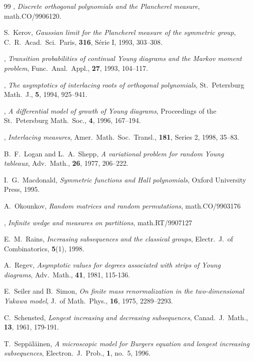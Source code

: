 \documentclass[12pt]{amsart}
\theoremstyle{plain}
\theoremstyle{definition}
\numberwithin{equation}{section}
\begin{document}
\begin{thebibliography}{99}
\bysame,
\emph{Discrete
orthogonal polynomials and the Plancherel measure},
math.CO/9906120.


S.~Kerov,
\emph{Gaussian limit for the Plancherel measure of the
symmetric group},
C.~R.\ Acad.\ Sci.\ Paris, \textbf{316}, S\'erie I, 1993,
303--308. 

\bysame,
\emph{Transition probabilities of continual Young diagrams
and the Markov moment problem},
Func.\ Anal.\ Appl., \textbf{27}, 1993, 104--117.


\bysame,
\emph{The asymptotics of interlacing roots of orthogonal
polynomials},
St.~Petersburg Math.~J., \textbf{5}, 1994, 925--941. 

\bysame,
\emph{A differential model of growth of Young diagrams},
Proceedings of the St.~Petersburg Math.\ Soc.,
\textbf{4}, 1996, 167--194. 

\bysame,
\emph{Interlacing measures},
Amer.\ Math.\ Soc.\ Transl., \textbf{181},
Series 2, 1998, 35--83.

B.~F.~Logan and L.~A.~Shepp,
\emph{A variational problem for random Young tableaux},
Adv.\ Math., \textbf{26}, 1977, 206--222. 


I.~G.~Macdonald,
\emph{Symmetric functions and Hall polynomials},
Oxford University Press, 1995. 

A.~Okounkov,
\emph{Random matrices and random permutations},
math.CO/9903176


\bysame,
\emph{Infinite wedge and measures on partitions},
math.RT/9907127


E.~M.~Rains,
\emph{Increasing subsequences and the classical groups},
Electr.\ J.\ of Combinatorics,
\textbf{5}(1), 1998.

A.~Regev,
\emph{Asymptotic values for degrees associated with strips
of Young diagrams},
Adv.\ Math., \textbf{41}, 1981, 115-136. 

E.~Seiler and B.~Simon,
\emph{On finite mass renormalization in the 
two-dimensional Yukawa model},
J.\ of Math.\ Phys., \textbf{16}, 1975, 2289--2293. 


C.~Schensted,
\emph{Longest increasing and decreasing subsequences},
Canad.\ J.\ Math., \textbf{13}, 1961, 179-191. 

T.~Sepp\"al\"ainen,
\emph{A microscopic model for Burgers equation and
longest increasing subsequences},
Electron.\  J.\  Prob.,
\textbf{1}, no.~5, 1996. 


\end{thebibliography}
\end{document}
